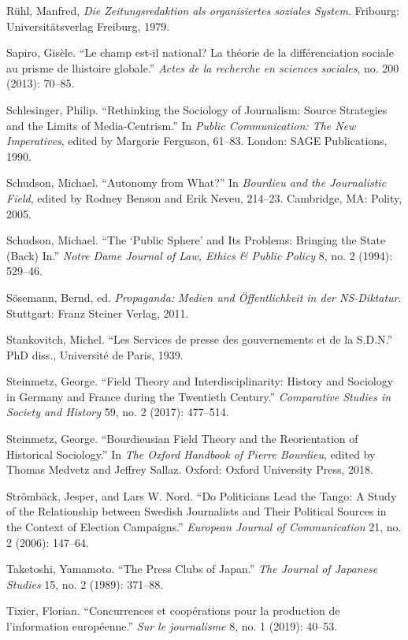 \documentclass{tufte-handout}
\begin{document}
\begin{hangparas}{.25in}{1}
Rühl, Manfred, \emph{Die Zeitungsredaktion als organisiertes soziales
System}. Fribourg: Universitätsverlag Freiburg, 1979.

Sapiro, Gisèle. ``Le champ est-il national? La théorie de la
différenciation sociale au prisme de l\textquotesingle histoire
globale.'' \emph{Actes de la recherche en sciences sociales}, no. 200
(2013): 70--85.

Schlesinger, Philip. ``Rethinking the Sociology of Journalism: Source
Strategies and the Limits of Media-Centrism.'' In \emph{Public
Communication: The New Imperatives}, edited by Margorie Ferguson,
61--83. London: SAGE Publications, 1990.

Schudson, Michael. ``Autonomy from What?'' In \emph{Bourdieu and the
Journalistic Field}, edited by Rodney Benson and Erik Neveu, 214--23.
Cambridge, MA: Polity, 2005.

Schudson, Michael. ``The `Public Sphere' and Its Problems: Bringing the
State (Back) In.'' \emph{Notre Dame Journal of Law, Ethics \& Public
Policy} 8, no. 2 (1994): 529--46.

Sösemann, Bernd, ed. \emph{Propaganda: Medien und Öffentlichkeit in der
NS-Diktatur}. Stuttgart: Franz Steiner Verlag, 2011.

Stankovitch, Michel. ``Les Services de presse des gouvernements et de la
S.D.N.'' PhD diss., Université de Paris, 1939.

Steinmetz, George. ``Field Theory and Interdisciplinarity: History and
Sociology in Germany and France during the Twentieth Century.''
\emph{Comparative Studies in Society and History} 59, no. 2 (2017):
477--514.

Steinmetz, George. ``Bourdieusian Field Theory and the Reorientation of
Historical Sociology.'' In \emph{The Oxford Handbook of Pierre
Bourdieu}, edited by Thomas Medvetz and Jeffrey Sallaz. Oxford: Oxford
University Press, 2018.

Strömbäck, Jesper, and Lars W. Nord. ``Do Politicians Lead the Tango: A
Study of the Relationship between Swedish Journalists and Their
Political Sources in the Context of Election Campaigns.'' \emph{European
Journal of Communication} 21, no. 2 (2006): 147--64.

Taketoshi, Yamamoto. ``The Press Clubs of Japan.'' \emph{The Journal of
Japanese Studies} 15, no. 2 (1989): 371--88.

Tixier, Florian. ``Concurrences et coopérations pour la production de
l'information européenne.'' \emph{Sur le journalisme} 8, no. 1 (2019):
40--53.


\end{hangparas}
\end{document}
